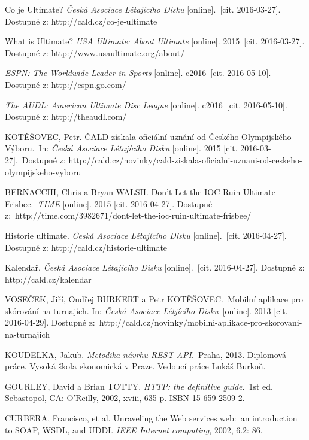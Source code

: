 \begin{thebibliography}{1}

Co je Ultimate? \textit{Česká Asociace Létajícího Disku} [online].\
[cit. 2016-03-27]. Dostupné z: http://cald.cz/co-je-ultimate

What is Ultimate? \textit{USA Ultimate: About Ultimate} [online]. 2015\
[cit. 2016-03-27]. Dostupné z: http://www.usaultimate.org/about/

\bibitem{espn}
\textit{ESPN: The Worldwide Leader in Sports} [online]. c2016\
[cit. 2016-05-10]. Dostupné z: http://espn.go.com/

\bibitem{audl}
\textit{The AUDL: American Ultimate Disc League} [online]. c2016\
[cit. 2016-05-10]. Dostupné z: http://theaudl.com/

KOTĚŠOVEC, Petr. ČALD získala oficiální uznání od Českého Olympijského Výboru.\
In: \textit{Česká Asociace Létajícího Disku} [online]. 2015 [cit. 2016-03-27].\
Dostupné z: http://cald.cz/novinky/cald-ziskala-oficialni-uznani-od-ceskeho-olympijskeho-vyboru

BERNACCHI, Chris a Bryan WALSH. Don’t Let the IOC Ruin Ultimate Frisbee.\
\textit{TIME} [online]. 2015 [cit. 2016-04-27]. Dostupné z:\
http://time.com/3982671/dont-let-the-ioc-ruin-ultimate-frisbee/



 Historie ultimate. \textit{Česká Asociace Létajícího Disku} [online].\
[cit. 2016-04-27]. Dostupné z: http://cald.cz/historie-ultimate

\bibitem{cald_kalendar} Kalendař. \textit{Česká Asociace Létajícího Disku} [online].\
[cit. 2016-04-27]. Dostupné z: http://cald.cz/kalendar

\bibitem{cald_catcher}
VOSEČEK, Jiří, Ondřej BURKERT a Petr KOTĚŠOVEC.\
Mobilní aplikace pro skórování na turnajích. In: \textit{Česká Asociace Létjícího Disku}\
[online]. 2013 [cit. 2016-04-29]. Dostupné z:\
http://cald.cz/novinky/mobilni-aplikace-pro-skorovani-na-turnajich

KOUDELKA, Jakub. \textit{Metodika návrhu REST API}.\
Praha, 2013. Diplomová práce. Vysoká škola ekonomická v Praze. Vedoucí práce Lukáš Burkoň.

GOURLEY, David a Brian TOTTY. \textit{HTTP: the definitive guide}.\
1st ed. Sebastopol, CA: O’Reilly, 2002, xviii, 635 p. ISBN 15-659-2509-2.

CURBERA, Francisco, et al. Unraveling the Web services web:\
an introduction to SOAP, WSDL, and UDDI. \textit{IEEE Internet computing}, 2002, 6.2: 86.


\end{thebibliography}
